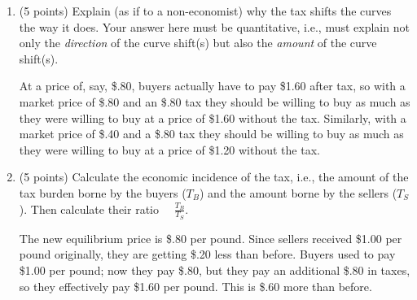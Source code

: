 \documentclass{article}
\begin{document}
\begin{enumerate}
\begin{enumerate}
    \item \begin{EXAM} (5 points) Explain (as if to a non-economist) why the tax shifts the curves the way it does. Your answer here must be quantitative, i.e., must explain not only the \emph{direction} of the curve shift(s) but also the \emph{amount} of the curve shift(s). \vspace{1.5in} \end{EXAM}

\begin{KEY} At a price of, say, \$.80, buyers actually have to pay \$1.60 after tax, so with a market price of \$.80 and an \$.80 tax they should be willing to buy as much as they were willing to buy at a price of \$1.60 without the tax. Similarly, with a market price of \$.40 and a \$.80 tax they should be willing to buy as much as they were willing to buy at a price of \$1.20 without the tax. %
\end{KEY}


    \item \begin{EXAM} (5 points) Calculate the economic incidence of the tax, i.e., the amount of the tax burden borne by the buyers ($T_B$) and the amount borne by the sellers ($T_S$). Then calculate their ratio \ \ $\displaystyle \frac{T_B}{T_S}$. \vspace{1.6in} \end{EXAM}

\begin{KEY} The new equilibrium price is \$.80 per pound. Since sellers received \$1.00 per pound originally, they are getting \$.20 less than before. Buyers used to pay \$1.00 per pound; now they pay \$.80, but they pay an additional \$.80 in taxes, so they effectively pay \$1.60 per pound. This is \$.60 more than before.



\end{KEY}
\end{enumerate}
\end{enumerate}
\end{document}
